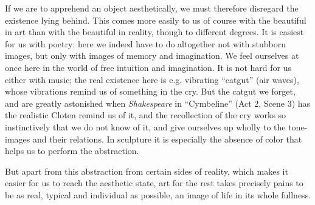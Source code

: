 \documentclass[12pt,a4paper,openany]{book}
\newcommand{\opage}[1]{\marginnote{\footnotesize\textit{[#1]}}}
\begin{document}
If we are to apprehend an object aesthetically, we must therefore disregard the existence
lying behind. This comes more easily to us of course with the beautiful in art than with
the beautiful in reality, though to different degrees. It is easiest for us with poetry:
here we indeed have to do altogether not with stubborn images, but only with images of
memory and imagination. We feel ourselves at once here in the world of free intuition and
imagination. It is not hard for us either with music; the real existence here is e.g.
vibrating ``catgut'' (air waves), whose vibrations remind us of something in the cry. But
the catgut we forget, and are greatly astonished when
\setcounter{footnote}{0}%
\opage{262}\emph{Shakespeare} in ``Cymbeline'' (Act 2, Scene 3) has the realistic Cloten
remind us of it, and the recollection of the cry works so instinctively that we do not
know of it, and give ourselves up wholly to the tone-images and their relations. In
sculpture it is especially the absence of color that helps us to perform the abstraction.

But apart from this abstraction from certain sides of reality, which makes it easier for
us to reach the aesthetic state, art for the rest takes precisely pains to be as real,
typical and individual as possible, an image of life in its whole fullness.
\end{document}

